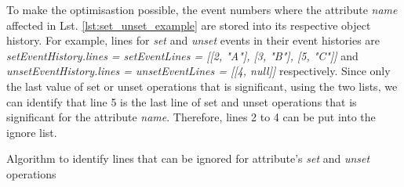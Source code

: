 \documentclass{llncs}
\begin{document}
To make the optimisastion possible, the event numbers where the attribute \emph{name} affected in Lst. \ref{lst:set_unset_example} are stored into its respective object history.  For example, lines for \emph{set} and \emph{unset} events in their event histories are \emph{setEventHistory.lines = setEventLines = [[2, "A"], [3, "B"], [5, "C"]]} and \emph{unsetEventHistory.lines = unsetEventLines = [[4, null]]} respectively. Since only the last value of set or unset operations that is significant, using the two lists, we can identify that line 5 is the last line of set and unset operations that is significant for the attribute \emph{name}. Therefore, lines 2 to 4 can be put into the ignore list.  

\begin{algorithm}
\begin{small}
\end{small}
\caption{Algorithm to identify lines that can be ignored for attribute's \emph{set} and \emph{unset} operations}
\label{alg:set_unset_optimisation}
\end{algorithm}
\end{document}
